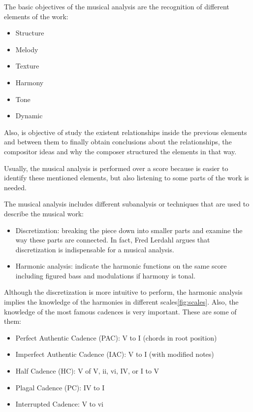 \documentclass[a4paper,openany,oneside,12pt]{book}
\begin{document}
The basic objectives of the musical analysis are the recognition of different elements of the work:

\begin{itemize}
\item Structure
\item Melody
\item Texture
\item Harmony
\item Tone
\item Dynamic
\end{itemize}

Also, is objective of study the existent relationships inside the previous elements and between them to finally obtain conclusions about the relationships, the compositor ideas and why the composer structured the elements in that way.

Usually, the musical analysis is performed over a score because is easier to identify these mentioned elements, but also listening to some parts of the work is needed.

The musical analysis includes different subanalysis or techniques that are used to describe the musical work:

\begin{itemize}
\item Discretization: breaking the piece down into smaller parts and examine the way these parts are connected. In fact, Fred Lerdahl\cite{Lerdahl} argues that discretization is indispensable for a musical analysis.
\item Harmonic analysis: indicate the harmonic functions on the same score including figured bass and modulations if harmony is tonal.
\end{itemize}

Although the discretization is more intuitive to perform, the harmonic analysis implies the knowledge of the harmonies in different scales\ref{fig:scales}. Also, the knowledge of the most famous cadences is very important. These are some of them:

\begin{itemize}
\item Perfect Authentic Cadence (PAC): V to I (chords in root position)
\item Imperfect Authentic Cadence (IAC): V to I (with modified notes)
\item Half Cadence (HC): V of V, ii, vi, IV, or I to V
\item Plagal Cadence (PC): IV to I
\item Interrupted Cadence: V to vi
\end{itemize}
\end{document}
